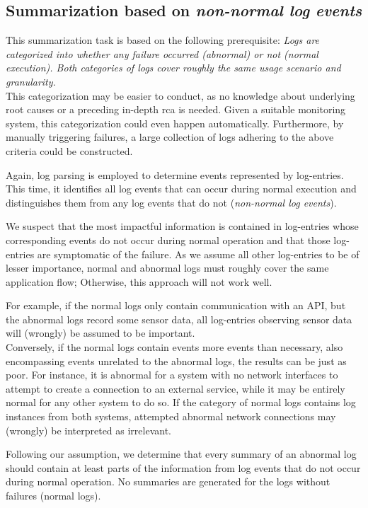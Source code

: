 \subsection{Summarization based on \emph{non-normal log events}}\label{subsec:non_normal_log_events_summarization}

This summarization task is based on the following prerequisite:
\emph{Logs are categorized into whether any failure occurred (abnormal) or not (normal execution).
Both categories of logs cover roughly the same usage scenario and granularity.}\\
This categorization may be easier to conduct, as no knowledge about underlying root causes or
a preceding in-depth \ac{rca} is needed.
Given a suitable monitoring system, this categorization could even happen automatically.
Furthermore, by manually triggering failures, a large collection of logs adhering to the above criteria could be constructed.

Again, log parsing is employed to determine events represented by log-entries.
This time, it identifies all log events that can occur during normal execution
and distinguishes them from any log events that do not (\emph{non-normal log events}).

We suspect that the most impactful information is contained in log-entries
whose corresponding events do not occur during normal operation
and that those log-entries are symptomatic of the failure.
As we assume all other log-entries to be of lesser importance,
normal and abnormal logs must roughly cover the same application flow;
Otherwise, this approach will not work well.

For example, if the normal logs only contain communication with an API,
but the abnormal logs record some sensor data,
all log-entries observing sensor data will (wrongly) be assumed to be important.\\
Conversely, if the normal logs contain events more events than necessary,
also encompassing events unrelated to the abnormal logs, the results can be just as poor.
For instance, it is abnormal for a system with no network interfaces to attempt to create a connection to an external service,
while it may be entirely normal for any other system to do so.
If the category of normal logs contains log instances from both systems,
attempted abnormal network connections may (wrongly) be interpreted as irrelevant.

Following our assumption, we determine that every summary of an abnormal log
should contain at least parts of the information from log events that do not occur during normal operation.
No summaries are generated for the logs without failures (normal logs).

